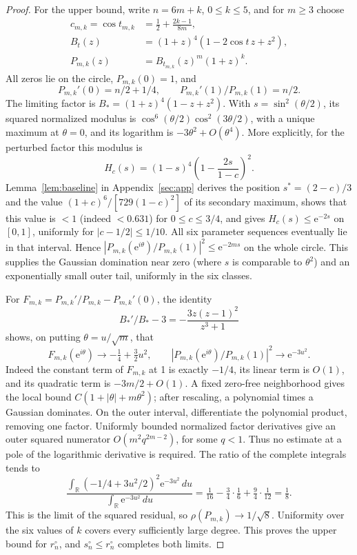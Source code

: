 \documentclass[11pt]{article}
\theoremstyle{remark}\newtheorem{remark}[theorem]{Remark}
\newcommand{\ee}{\mathrm e}
\begin{document}
\begin{proof}
For the upper bound, write \(n=6m+k\), \(0\le k\le5\), and for
\(m\ge3\) choose
\begin{align*}
 c_{m,k}=\cos t_{m,k}&=\tfrac12+\frac{2k-1}{8m},\\
 B_t(z)&=(1+z)^4(1-2\cos t\,z+z^2),\\
 P_{m,k}(z)&=B_{t_{m,k}}(z)^m(1+z)^k.
\end{align*}
All zeros lie on the circle, \(P_{m,k}(0)=1\), and
\[
 P_{m,k}'(0)=n/2+1/4,\qquad
 P_{m,k}'(1)/P_{m,k}(1)=n/2.
\]
The limiting factor is \(B_*=(1+z)^4(1-z+z^2)\).
With \(s=\sin^2(\theta/2)\), its squared normalized modulus is
\(\cos^6(\theta/2)\cos^2(3\theta/2)\), with a unique maximum at
\(\theta=0\), and its logarithm is \(-3\theta^2+O(\theta^4)\).
More explicitly, for the perturbed factor this modulus is
\[
 H_c(s)=(1-s)^4\left(1-\frac{2s}{1-c}\right)^2.
\]
Lemma~\ref{lem:baseline} in Appendix~\ref{sec:app} derives the
position \(s^*=(2-c)/3\) and the value
\((1+c)^6/[729(1-c)^2]\) of its secondary maximum, shows that this
value is \(<1\) (indeed \(<0.631\)) for \(0\le c\le3/4\), and gives
\(H_c(s)\le\ee^{-2s}\) on \([0,1]\), uniformly for \(|c-1/2|\le1/10\).
All six parameter sequences eventually lie in that interval. Hence
\(|P_{m,k}(\ee^{i\theta})/P_{m,k}(1)|^2\le\ee^{-2ms}\) on the whole
circle. This supplies the Gaussian domination near zero (where
\(s\) is comparable to \(\theta^2\)) and an exponentially small outer
tail, uniformly in the six classes.

For \(F_{m,k}=P_{m,k}'/P_{m,k}-P_{m,k}'(0)\), the identity
\[
 B_*'/B_*-3=-\frac{3z(z-1)^2}{z^3+1}
\]
shows, on putting \(\theta=u/\sqrt m\), that
\[
 F_{m,k}(\ee^{i\theta})\longrightarrow-\tfrac14+\tfrac32u^2,
 \qquad
 |P_{m,k}(\ee^{i\theta})/P_{m,k}(1)|^2\longrightarrow\ee^{-3u^2}.
\]
Indeed the constant term of \(F_{m,k}\) at 1 is exactly \(-1/4\),
its linear term is \(O(1)\), and its quadratic term is
\(-3m/2+O(1)\). A fixed zero-free neighborhood gives the local bound
\(C(1+|\theta|+m\theta^2)\); after rescaling, a polynomial times
a Gaussian dominates. On the outer interval, differentiate the
polynomial product, removing one factor. Uniformly bounded normalized
factor derivatives give an outer squared numerator
\(O(m^2q^{2m-2})\), for some \(q<1\). Thus no estimate at a
pole of the logarithmic derivative is required.
The ratio of the complete integrals tends to
\[
 \frac{\int_{\mathbb R}(-1/4+3u^2/2)^2\ee^{-3u^2}\,du}
 {\int_{\mathbb R}\ee^{-3u^2}\,du}
 =\tfrac1{16}-\tfrac34\cdot\tfrac16+\tfrac94\cdot\tfrac1{12}
 =\tfrac18.
\]
This is the limit of the squared residual, so
\(\rho(P_{m,k})\to1/\sqrt8\).
Uniformity over the six values of \(k\) covers every sufficiently
large degree. This proves the upper bound for \(r_n^\circ\), and
\(s_n^\circ\le r_n^\circ\) completes both limits.
\end{proof}
\end{document}
